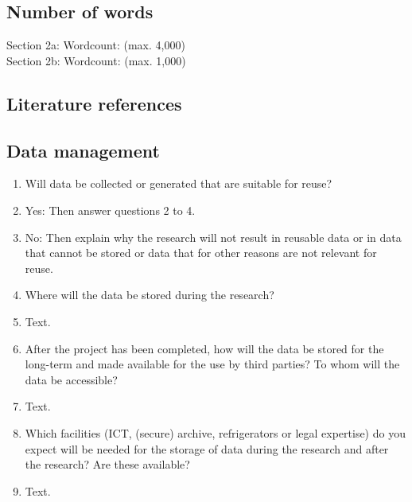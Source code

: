 \subsection{Number of words}\label{sec:proposal}

Section 2a: Wordcount:     (max. 4,000)\\
Section 2b: Wordcount:     (max. 1,000)


\newpage
\subsection{Literature references}\label{sec:ref}

\newrefcontext[sorting=nyt]
\printbibliography[heading=none,notcategory=fullcited]


\newpage
\subsection{Data management}\label{sec:dataman}

\begin{enumerate}
    \item Will data be collected or generated that are suitable for reuse?
    \item[] \checkedbox[1em] Yes: Then answer questions 2 to 4.
    \item[] \checkbox[1em] No: Then explain why the research will not result in reusable data or in data that cannot be stored or data that for other reasons are not relevant for reuse.
    \vspace{6pt}
    \item Where will the data be stored during the research?
    \vspace{6pt}
    \item[] Text.
    \vspace{6pt}

    \item After the project has been completed, how will the data be stored for the long-term and made available for the use by third parties? To whom will the data be accessible?
    \vspace{6pt}
    \item[] Text.
    \vspace{6pt}

    \item Which facilities (ICT, (secure) archive, refrigerators or legal expertise) do you expect will be needed for the storage of data during the research and after the research? Are these available?
    \vspace{6pt}
    \item[] Text.
    \vspace{6pt}
\end{enumerate}


